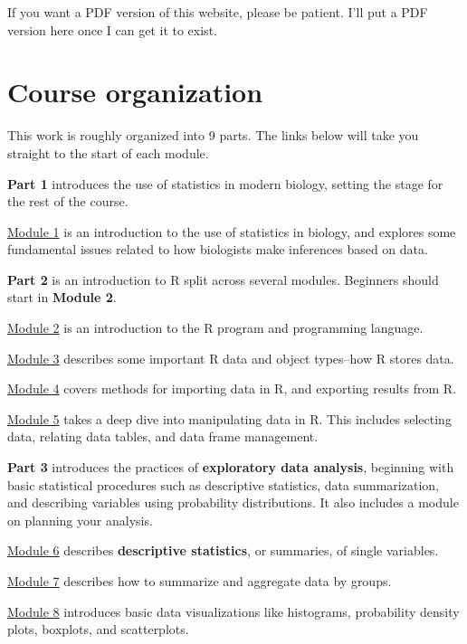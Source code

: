 \documentclass[
  13,
  letterpaper,
]{report}
\begin{document}
If you want a PDF version of this website, please be patient. I'll put a
PDF version here once I can get it to exist.

\section*{Course organization}\label{course-organization}


This work is roughly organized into 9 parts. The links below will take
you straight to the start of each module.

\textbf{Part 1} introduces the use of statistics in modern biology,
setting the stage for the rest of the course.

\hyperref[sec-01]{Module 1} is an introduction to the use of statistics
in biology, and explores some fundamental issues related to how
biologists make inferences based on data.

\textbf{Part 2} is an introduction to R split across several modules.
Beginners should start in \textbf{Module 2}.

\hyperref[sec-02]{Module 2} is an introduction to the R program and
programming language.

\hyperref[sec-03]{Module 3} describes some important R data and object
types--how R stores data.

\hyperref[sec-04]{Module 4} covers methods for importing data in R, and
exporting results from R.

\hyperref[sec-05]{Module 5} takes a deep dive into manipulating data in
R. This includes selecting data, relating data tables, and data frame
management.

\textbf{Part 3} introduces the practices of \textbf{exploratory data
analysis}, beginning with basic statistical procedures such as
descriptive statistics, data summarization, and describing variables
using probability distributions. It also includes a module on planning
your analysis.

\hyperref[sec-06]{Module 6} describes \textbf{descriptive statistics},
or summaries, of single variables.

\hyperref[sec-07]{Module 7} describes how to summarize and aggregate
data by groups.

\hyperref[sec-08]{Module 8} introduces basic data visualizations like
histograms, probability density plots, boxplots, and scatterplots.
\end{document}
